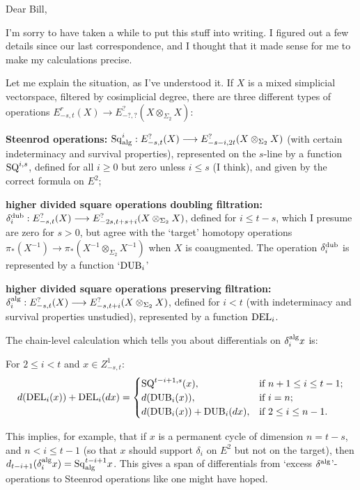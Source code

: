\documentclass[10pt]{article}
\newcommand{\Sq}{\mathrm{Sq}}
\begin{document}
\begin{letter to Dwyer}

\noindent Dear Bill,

I'm sorry to have taken a while to put this stuff into writing. I figured out a few details since our last correspondence, and I thought that it made sense for me to make my calculations precise.

Let me explain the situation, as I've understood it. If $X$ is a mixed simplicial vectorspace, filtered by cosimplicial degree, there are three different types of operations $E^r_{-s,t}(X)\to E^?_{-?,?}(X\otimes_{\Sigma_2}X)$:
\begin{itemise}
\setlength{\parindent}{.25in}
\item \textbf{Steenrod operations:} $\Sq^i_\textup{alg}:E^?_{-s,t}(X)\to E^?_{-s-i,2t}(X\otimes_{\Sigma_2}X)$ (with certain indeterminacy and survival properties), represented on the $s$-line by a function $\textup{SQ}^{i,s}$, defined for all $i\geq0$ but zero unless $i\leq s$ (I think), and given by the correct formula on $E^2$;
\item \textbf{higher divided square operations doubling filtration:} $\delta_i^\textup{dub}:E^?_{-s,t}(X)\to E^?_{-2s,t+s+i}(X\otimes_{\Sigma_2}X)$, defined for $i\leq t-s$, which I presume are zero for $s>0$, but agree with the `target' homotopy operations $\pi_*(X^{-1})\to \pi_*(X^{-1}\otimes_{\Sigma_2}X^{-1})$ when $X$ is coaugmented. The operation $\delta_i^\textup{dub}$ is represented by a function `$\textup{DUB}_i$'
\item \textbf{higher divided square operations preserving filtration:}
$\delta_i^\textup{alg}:E^?_{-s,t}(X)\to E^?_{-s,t+i}(X\otimes_{\Sigma_2}X)$, defined for $i<t$ (with indeterminacy and survival properties unstudied), represented by a function $\textup{DEL}_{i}$.
\end{itemise}
The chain-level calculation which tells you about differentials on $\delta_i^\textup{alg}x$ is:
\begin{prop*}
For $2\leq i<t$ and $x\in Z^1_{-s,t}$:
\[d(\textup{DEL}_i(x))+ \textup{DEL}_i(dx)=\begin{cases}
\textup{SQ}^{t-i+1,s}(x),&\textup{if }n+1\leq i \leq t-1;\\
d(\textup{DUB}_i(x)),&\textup{if }i=n;\\
d(\textup{DUB}_i(x))+\textup{DUB}_i(dx),&\textup{if }2\leq i\leq n-1.
\end{cases}\]
\end{prop*}
This implies, for example, that if $x$ is a permanent cycle of dimension $n=t-s$, and $n<i\leq t-1$ (so that $x$ should support $\delta_i$ on $E^2$ but not on the target), then $d_{t-i+1}(\delta_i^\textup{alg}x)=\Sq^{t-i+1}_\textup{alg}x$. This gives a span of differentials from `excess $\delta^\textup{alg}$'-operations to Steenrod operations like one might have hoped.


\end{letter to Dwyer}
\end{document}
